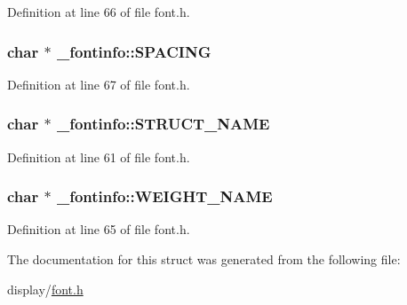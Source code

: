 Definition at line 66 of file font.\-h.

\hypertarget{struct__fontinfo_a0e6fafc8f03c70ce9c506d7a506fbba4}{
\subsubsection[{S\-P\-A\-C\-I\-N\-G}]{\setlength{\rightskip}{0pt plus 5cm}char $\ast$ \-\_\-fontinfo\-::\-S\-P\-A\-C\-I\-N\-G}}\label{struct__fontinfo_a0e6fafc8f03c70ce9c506d7a506fbba4}


Definition at line 67 of file font.\-h.

\hypertarget{struct__fontinfo_a861ecb4b5f190ccd1e71b38270240f86}{
\subsubsection[{S\-T\-R\-U\-C\-T\-\_\-\-N\-A\-M\-E}]{\setlength{\rightskip}{0pt plus 5cm}char $\ast$ \-\_\-fontinfo\-::\-S\-T\-R\-U\-C\-T\-\_\-\-N\-A\-M\-E}}\label{struct__fontinfo_a861ecb4b5f190ccd1e71b38270240f86}


Definition at line 61 of file font.\-h.

\hypertarget{struct__fontinfo_a2f528cb5c1bceb6afd91ad138472d071}{
\subsubsection[{W\-E\-I\-G\-H\-T\-\_\-\-N\-A\-M\-E}]{\setlength{\rightskip}{0pt plus 5cm}char $\ast$ \-\_\-fontinfo\-::\-W\-E\-I\-G\-H\-T\-\_\-\-N\-A\-M\-E}}\label{struct__fontinfo_a2f528cb5c1bceb6afd91ad138472d071}


Definition at line 65 of file font.\-h.



The documentation for this struct was generated from the following file\-:\begin{DoxyCompactItemize}
\item 
display/\hyperlink{display_2font_8h}{font.\-h}\end{DoxyCompactItemize}
